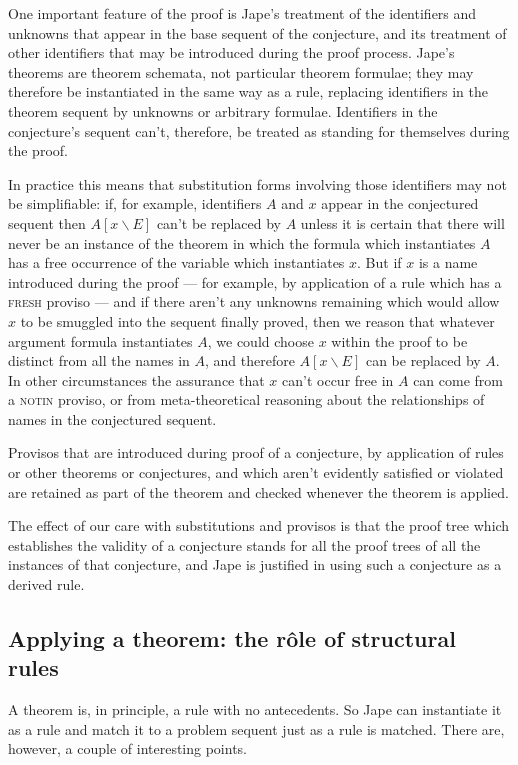 One important feature of the proof is Jape's treatment of the identifiers and unknowns that appear in the base sequent of the conjecture, and its treatment of other identifiers that may be introduced during the proof process. Jape's theorems are theorem schemata, not particular theorem formulae; they may therefore be instantiated in the same way as a rule, replacing identifiers in the theorem sequent by unknowns or arbitrary formulae. Identifiers in the conjecture's sequent can't, therefore, be treated as standing for themselves during the proof.

In practice this means that substitution forms involving those identifiers may not be simplifiable: if, for example, identifiers $A$ and $x$ appear in the conjectured sequent then $A[x\backslash E]$ can't be replaced by $A$ unless it is certain that there will never be an instance of the theorem in which the formula which instantiates $A$ has a free occurrence of the variable which instantiates $x$. But if $x$ is a name introduced during the proof --- for example, by application of a rule which has a \textsc{fresh} proviso --- and if there aren't any unknowns remaining which would allow $x$ to be smuggled into the sequent finally proved, then we reason that whatever argument formula instantiates $A$, we could choose $x$ within the proof to be distinct from all the names in $A$, and therefore $A[x\backslash E]$ can be replaced by $A$. In other circumstances the assurance that $x$ can't occur free in $A$ can come from a \textsc{notin} proviso, or from meta-theoretical reasoning about the relationships of names in the conjectured sequent.

Provisos that are introduced during proof of a conjecture, by application of rules or other theorems or conjectures, and which aren't evidently satisfied or violated are retained as part of the theorem and checked whenever the theorem is applied.

The effect of our care with substitutions and provisos is that the proof tree which establishes the validity of a conjecture stands for all the proof trees of all the instances of that conjecture, and Jape is justified in using such a conjecture as a derived rule.

\subsection{Applying a theorem: the r\^{o}le of structural rules}
\label{sec:basics:application}

A theorem is, in principle, a rule with no antecedents. So Jape can instantiate it as a rule and match it to a problem sequent just as a rule is matched. There are, however, a couple of interesting points.

